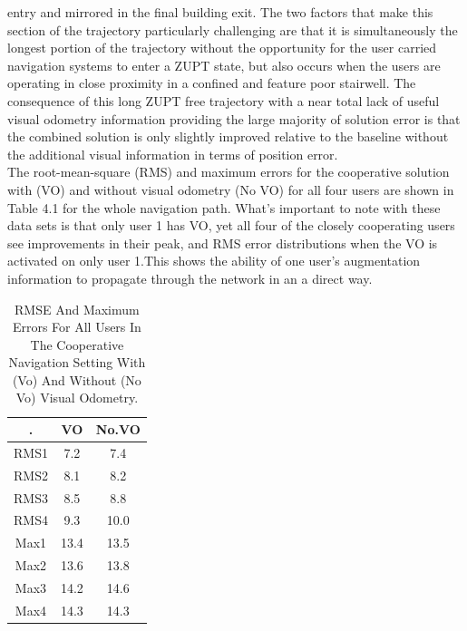 entry and mirrored in the final building exit. The two factors
that make this section of the trajectory particularly challenging
are that it is simultaneously the longest portion of the trajectory
without the opportunity for the user carried navigation systems
to enter a ZUPT state, but also occurs when the users are
operating in close proximity in a confined and feature poor
stairwell. The consequence of this long ZUPT free trajectory
with a near total lack of useful visual odometry information
providing the large majority of solution error is that the
combined solution is only slightly improved relative to the baseline without the additional visual information in terms of
position error.\\
The root-mean-square (RMS) and maximum errors for the
cooperative solution with (VO) and without visual odometry
(No VO) for all four users are shown in Table 4.1 for the whole
navigation path. What’s important to note with these data
sets is that only user 1 has VO, yet all four of the closely
cooperating users see improvements in their peak, and RMS
error distributions when the VO is activated on only user 1.This shows the ability of one user’s augmentation information
to propagate through the network in an a direct way.
\begin{table}[]
    \centering
       \caption{RMSE And Maximum Errors For All Users In The Cooperative
Navigation Setting With (Vo) And Without (No Vo)
 Visual Odometry.
}
\vline
    \begin{tabular}{c|c|c}
    \hline
         .& VO & No.VO \\
         \hline
        RMS1 & 7.2 & 7.4\\
        RMS2 & 8.1 & 8.2\\
        RMS3 & 8.5 & 8.8\\
        RMS4 & 9.3 & 10.0\\
        \hline
        Max1 & 13.4 & 13.5\\
        Max2 & 13.6 & 13.8\\
        Max3 & 14.2 & 14.6\\
        Max4 & 14.3 & 14.3\\
        \hline
    \end{tabular}
\vline 
    
\end{table}
